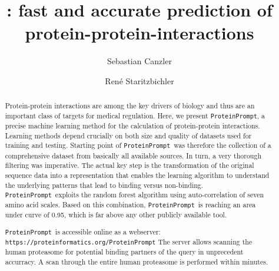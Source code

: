 \documentclass[3p,times,twocolumn]{elsarticle}
\title{\tool: fast and accurate prediction of protein-protein-interactions}
\newcommand{\url}[1]{\texttt{https://\small #1}}
\newcommand{\tool}{\texttt{ProteinPrompt}}
\newcommand{\website}{\url{proteinformatics.org/\tool}}
\begin{document}

  

%  
%  

\author[LEI,IMT]{Sebastian Canzler}
\author[PHY,IMT]{Ren\'{e} Staritzbichler}


\address[LEI]{Bioinformatics Group, Department of Computer Science,
  University of Leipzig,
  H{\"a}rtelstra{\ss}e 16-18, 04107 Leipzig, Germany
}
\address[PHY]{ProteinFormatics Group, Institute of Medical Physics and Biophysics, University of Leipzig,
  H{\"a}rtelstra{\ss}e 16-18, 04107 Leipzig, Germany.}

\address[IMT]{Immuthera GmbH, L{\"o}{\ss}niger Stra{\ss}e 16, 04275 Leipzig, Germany.}




 

\begin{abstract}

  Protein-protein interactions are among the key drivers of biology and thus are an important class of targets for medical regulation.
  Here, we present \tool, a precise machine learning method for the calculation of protein-protein interactions.
  Learning methods depend crucially on both size and quality of datasets used for training and testing.
  Starting point of \tool\  was therefore the collection of a comprehensive dataset from basically all available sources.
  In turn, a very thorough filtering was imperative.
  The actual key step is the transformation of the original sequence data into a representation that enables the learning algorithm to understand the underlying patterns that lead to binding versus non-binding.
   \tool\  exploits the random forest algorithm using auto-correlation of seven amino acid scales.
   Based on this combination, \tool\  is reaching an area under curve of 0.95, which is far above any other publicly available tool. 
  
  \tool\   is accessible online as a webserver:
  \website
  The server allows  scanning the human proteasome for potential binding partners of the query in unprecedent accurracy.
  A scan through the entire human proteasome is performed within minutes.  
  

\end{abstract}
\end{document}
